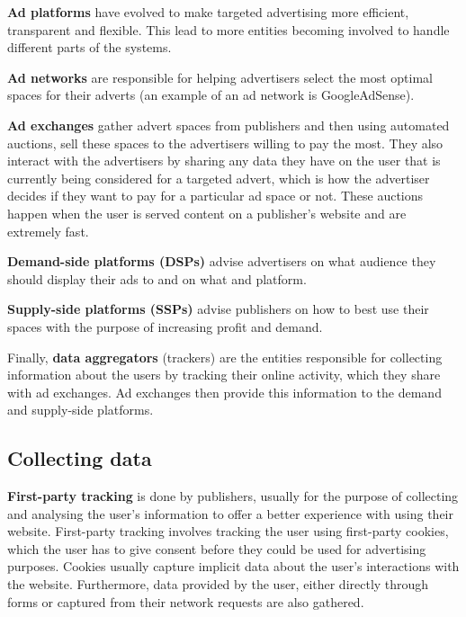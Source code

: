 \documentclass{l4proj}
\begin{document}
\textbf{Ad platforms} have evolved to make targeted advertising more efficient, transparent and flexible. This lead to more entities becoming involved to handle different parts of the systems. 

\textbf{Ad networks} are responsible for helping advertisers select the most optimal spaces for their adverts (an example of an ad network is GoogleAdSense).

\textbf{Ad exchanges} gather advert spaces from publishers and then using automated auctions, sell these spaces to the advertisers willing to pay the most. They also interact with the advertisers by sharing any data they have on the user that is currently being considered for a targeted advert, which is how the advertiser decides if they want to pay for a particular ad space or not. These auctions happen when the user is served content on a publisher's website and are extremely fast.

\textbf{Demand-side platforms (DSPs)} advise advertisers on what audience they should display their ads to and on what and platform. 

\textbf{Supply-side platforms (SSPs)} advise publishers on how to best use their spaces with the purpose of increasing profit and demand. 

Finally, \textbf{data aggregators} (trackers) are the entities responsible for collecting information about the users by tracking their online activity, which they share with ad exchanges. Ad exchanges then provide this information to the demand and supply-side platforms.

\subsection{Collecting data}
\textbf{First-party tracking} is done by publishers, usually for the purpose of collecting and analysing the user's information to offer a better experience with using their website. First-party tracking involves tracking the user using first-party cookies, which the user has to give consent before they could be used for advertising purposes. Cookies usually capture implicit data about the user's interactions with the website. Furthermore, data provided by the user, either directly through forms or captured from their network requests are also gathered.
\end{document}
